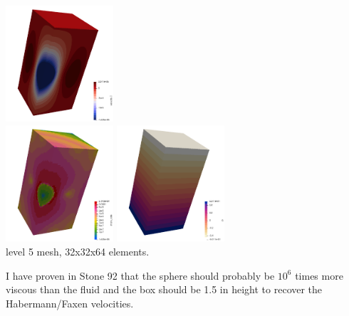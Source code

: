 \begin{center}
\includegraphics[width=4cm]{images/stokes_sphere3D/aspect_gr_CYL/w}\\
\includegraphics[width=4cm]{images/stokes_sphere3D/aspect_gr_CYL/sr}
\includegraphics[width=4cm]{images/stokes_sphere3D/aspect_gr_CYL/press}\\
{\captionfont level 5 mesh, 32x32x64 elements.}
\end{center}

I have proven in Stone 92 that the sphere should probably be $10^6$
times more viscous than the fluid and the box should be 1.5 in height 
to recover the Habermann/Faxen velocities. 

